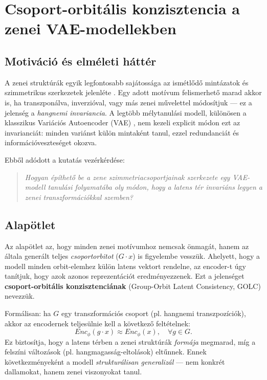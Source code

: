 \section{Csoport-orbitális konzisztencia a zenei VAE-modellekben}

\subsection{Motiváció és elméleti háttér}

A zenei struktúrák egyik legfontosabb sajátossága az ismétlődő mintázatok és szimmetrikus szerkezetek jelenléte \cite{Temperley2001, Lerdahl2004}.  
Egy adott motívum felismerhető marad akkor is, ha transzponálva, inverzióval, vagy más zenei művelettel módosítjuk — ez a jelenség a \textit{hangnemi invariancia}.  
A legtöbb mélytanulási modell, különösen a klasszikus Variációs Autoencoder (VAE) \cite{Kingma2013}, nem kezeli explicit módon ezt az invarianciát: minden variánst külön mintaként tanul, ezzel redundanciát és információveszteséget okozva.

Ebből adódott a kutatás vezérkérdése:  
\begin{quote}
\textit{Hogyan építhető be a zene szimmetriacsoportjainak szerkezete egy VAE-modell tanulási folyamatába oly módon, hogy a latens tér invariáns legyen a zenei transzformációkkal szemben?}
\end{quote}

\subsection{Alapötlet}

Az alapötlet az, hogy minden zenei motívumhoz nemcsak önmagát, hanem az általa generált teljes \emph{csoportorbitot} (\(G \cdot x\)) is figyelembe vesszük.  
Ahelyett, hogy a modell minden orbit-elemhez külön latens vektort rendelne, az encoder-t úgy tanítjuk, hogy azok azonos reprezentációt eredményezzenek.  
Ezt a jelenséget \textbf{csoport-orbitális konzisztenciának} (Group-Orbit Latent Consistency, GOLC) nevezzük.

Formálisan: ha \(G\) egy transzformációs csoport (pl. hangnemi transzpozíciók), akkor az encodernek teljesülnie kell a következő feltételnek:
\[
Enc_\phi(g \cdot x) \approx Enc_\phi(x), \quad \forall g \in G.
\]
Ez biztosítja, hogy a latens térben a zenei struktúrák \emph{formája} megmarad, míg a felszíni változások (pl. hangmagasság-eltolások) eltűnnek.  
Ennek következményeként a modell \emph{strukturálisan generalizál} — nem konkrét dallamokat, hanem zenei viszonyokat tanul.

